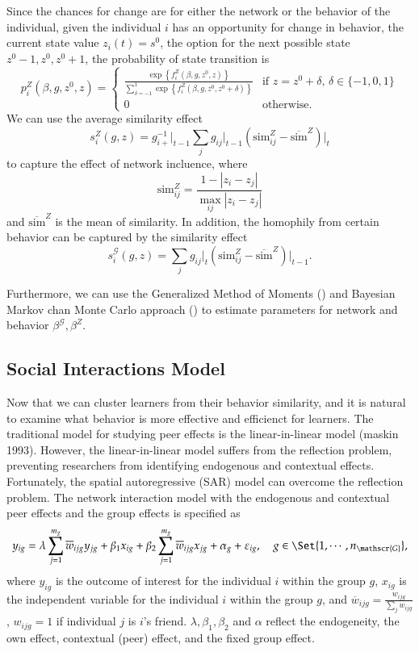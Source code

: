 \documentclass[a4paper]{article}
\theoremstyle{plain}
\begin{document}
Since the chances for change are for either the network or the behavior of the individual,
given the individual $i$ has an opportunity for change in behavior, the current
state value $z_i(t)=s^0$, the option for the next possible state $z^0-1,z^0,z^0+1$,
the probability of state transition is 
\[
    p_i^Z(\beta,g,z^0,z)= \begin{cases}
        \frac{\exp\left\{f_i^Z(\beta,g,z^0,z)\right\}}{\sum_{\delta=-1}^1\exp\left\{f_i^Z(\beta,g,z^0,z^0+\delta)\right\}}
        & \text{if } z=z^0+\delta, \, \delta\in\{-1,0,1\} \\
        0 & \text{otherwise.}
    \end{cases}
\]
We can use the average similarity effect 
\[
    s_{i}^Z(g,z)=g_{i+}^{-1}\bigg\rvert_{t-1}\sum_{j}g_{ij}\bigg\rvert_{t-1}
    \left(\text{sim}_{ij}^Z-\overline{\text{sim}}^Z\right)\bigg\rvert_{t}
\]
to capture the effect of network incluence, where
\[
    \text{sim}_{ij}^Z=\frac{1-|z_i-z_j|}{\max_{ij}|z_i-z_j|}
\]
and $\overline{\text{sim}}^Z$ is the mean of similarity. In addition, the homophily
from certain behavior can be captured by the similarity effect
\[
    s_i^\mathscr{G}(g,z)=\sum_{j}g_{ij}\bigg\rvert_{t}
    \left(\text{sim}_{ij}^Z-\overline{\text{sim}}^Z\right)\bigg\rvert_{t-1}.
\]

Furthermore, we can use the Generalized Method of Moments (\citet{dyes})
and Bayesian Markov chan Monte Carlo approach (\citet{dybaye})
to estimate parameters for network and behavior $\beta^\mathscr{G}, \beta^Z$.

\subsection{Social Interactions Model}
Now that we can cluster learners from their behavior similarity, and it is natural to examine
what behavior is more effective and efficienct for learners.
The traditional model for studying peer effects is the
linear-in-linear model (maskin 1993). 
However, the linear-in-linear model suffers from the reflection
problem, preventing researchers from identifying endogenous and contextual effects.
Fortunately, the spatial autoregressive (SAR) model can overcome the reflection problem.
The network interaction model with the endogenous and
contextual peer effects and the group effects
is specified as
\[
    y_{ig}=\lambda\sum_{j=1}^{m_g}\overline{w}_{ijg}y_{jg}+\beta_1x_{ig}
    +\beta_2\sum_{j=1}^{m_g}\overline{w}_{ijg}x_{jg}
    +\alpha_g+\varepsilon_{ig},\quad g\in\Set{1,\cdots,n_\mathscr{G}},
\]
where $y_{ig}$ is the outcome of interest for the
individual $i$ within the group $g$,
$x_{ig}$ is the independent variable 
for the individual $i$ within the group $g$,
and 
$\overline{w}_{ijg}=\frac{w_{ijg}}{\sum_jw_{ijg}}$,
$w_{ijg}=1$ if individual $j$ is $i$'s friend.
$\lambda,\beta_1,\beta_2$ and $\alpha$ reflect the endogeneity, 
the own effect, contextual (peer) effect, and the fixed group effect.
\end{document}

